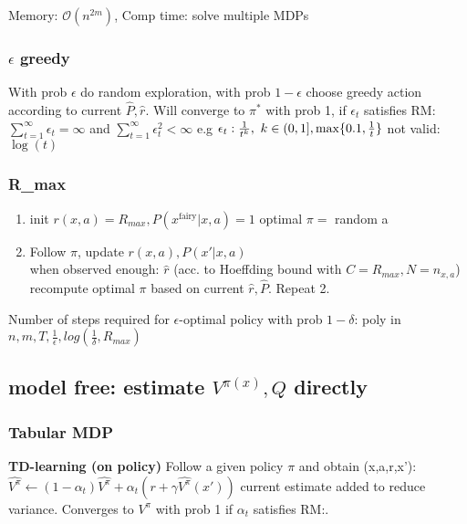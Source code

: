 Memory: $\mathcal{O}(n^{2m})$, Comp time: solve multiple MDPs

\subsubsection{$\epsilon$ greedy}
With prob $\epsilon$ do random exploration, with prob $1-\epsilon$ choose greedy action according to current
$\hat{P}, \hat{r}$.
Will converge to $\pi^{*}$ with prob 1, if $\epsilon_{t}$ satisfies \color{magenta}RM:\color{black}
$\sum_{t=1}^{\infty}\epsilon_{t} = \infty$ and $\sum_{t=1}^{\infty}\epsilon_{t}^{2} < \infty$
e.g $\epsilon_{t}:\frac{1}{t^{k}},\ k \in (0,1],\max\cset{0.1,\frac{1}{t}}$ not valid: $\log(t)$


\subsubsection{R_{max}}
\begin{enumerate}
    \item init $r(x,a) = R_{max}, P(x^{\text{fairy}}|x,a)=1$ \textrightarrow optimal $\pi=$ random a
    \item Follow $\pi$, update $r(x,a), P(x'|x,a)$\\
    when observed enough: $\hat{r}$ (acc. to Hoeffding bound with $C=R_{max}, N=n_{x,a}$)\\
        recompute optimal $\pi$ based on current $\hat{r}, \hat{P}$. Repeat 2.
\end{enumerate}
Number of steps required for $\epsilon$-optimal policy with prob $1-\delta$:
poly in $n,m,T,\frac{1}{\epsilon}, log(\frac{1}{\delta}, R_{max})$


\subsection{model free: estimate $V^{\pi(x)}, Q$ directly}


\subsubsection{Tabular MDP}


\textbf{TD-learning (on policy)}
Follow a given policy $\pi$ and obtain (x,a,r,x'):
$\hat{V^\pi} \leftarrow (1-\alpha_{t})\hat{V^\pi} + \alpha_t (r + \gamma \hat{V^\pi}(x'))$
current estimate added to reduce variance.
Converges to $V^\pi$ with prob 1 if $\alpha_{t}$ satisfies \color{magenta}RM:\color{black}.\\

